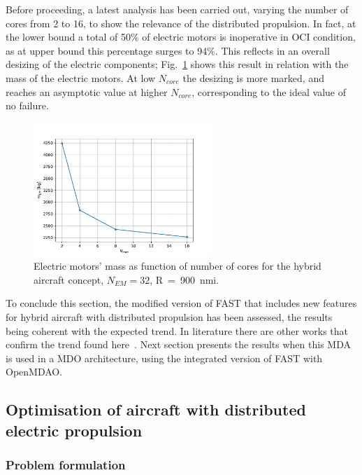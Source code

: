 Before proceeding, a latest analysis has been carried out, varying the number of cores from 2 to 16, to show the relevance of the distributed propulsion. 
In fact, at the lower bound a total of 50\% of electric motors is inoperative in OCI condition, as at upper bound this percentage surges to 94\%. 
This reflects in an overall desizing of the electric components; Fig.~\ref{fig:hybrid_dep_motor_mass} shows this result in relation with the mass of the electric motors.
At low $N_{core}$ the desizing is more marked, and reaches an asymptotic value at higher $N_{core}$, corresponding to the ideal value of no failure. 
\begin{figure}[!h]
	\centering
	\includegraphics[keepaspectratio, width=0.6\textwidth]{images/chap3/hybrid_dep_motor_weight}
	\caption{Electric motors' mass as function of number of cores for the hybrid aircraft concept, $N_{EM}=32$, R~=~900~nmi.}
	\label{fig:hybrid_dep_motor_mass}
\end{figure}

To conclude this section, the modified version of FAST that includes new features for hybrid aircraft with distributed propulsion has been assessed, the results being coherent with the expected trend.
In literature there are other works that confirm the trend found here~\cite{bib:hepperle, bib:pornet, bib:seitz, bib:steiner}.
Next section presents the results when this MDA is used in a MDO architecture, using the integrated version of FAST with OpenMDAO. 

\subsection{Optimisation of aircraft with distributed electric propulsion}
\label{subsec:chap3_hybrid_expl_optim}

\subsubsection{Problem formulation}
\label{subsubsec:chap3_problem_formulation}

